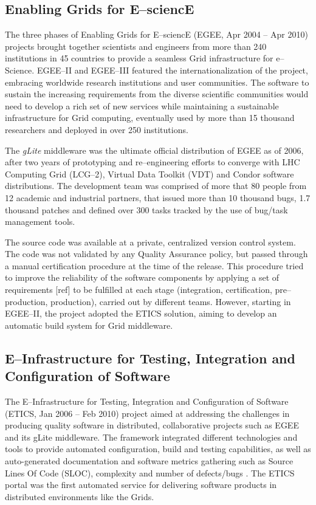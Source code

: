 \documentclass[journal]{IEEEtran}
\begin{document}
\subsection{Enabling Grids for E--sciencE}

The three phases of Enabling Grids for E--sciencE (EGEE, Apr 2004 -- Apr 2010)
\cite{cordis:egee, cordis:egee2, cordis:egee3} projects brought together
scientists and engineers from more than 240 institutions in 45 countries to
provide a seamless Grid infrastructure for e--Science. EGEE--II and EGEE--III
featured the internationalization of the project, embracing worldwide research
institutions and user communities. The software to sustain the increasing
requirements from the diverse scientific communities would need to develop a
rich set of new services while maintaining a sustainable infrastructure for
Grid computing, eventually used by more than 15 thousand researchers and deployed in
over 250 institutions.

The {\sl gLite} middleware \cite{glite} was the ultimate
official distribution of EGEE as of 2006, after two years of prototyping and
re--engineering efforts to converge with LHC Computing Grid (LCG--2), Virtual
Data Toolkit (VDT) and Condor \cite{condor} software distributions. The
development team was comprised of more that 80 people from 12 academic and
industrial partners, that issued more than 10 thousand bugs, 1.7 thousand patches and
defined over 300 tasks tracked by the use of bug/task management tools.

The
source code was available at a private, centralized version control system.
The code was not validated by any Quality Assurance policy, but passed through a manual
certification procedure at the time of the release. This procedure tried to
improve the reliability of the software components by applying a set of
requirements [ref] to be fulfilled at each stage (integration, certification,
pre--production, production), carried out by different teams. However, starting in
EGEE--II, the project adopted the ETICS solution, aiming to develop
an automatic build system for Grid middleware.

\subsection{E--Infrastructure for Testing, Integration and Configuration of Software}

The E--Infrastructure for Testing, Integration and Configuration of Software
\cite{cordis:etics, cordis:etics2} (ETICS, Jan 2006 -- Feb 2010) project aimed
at addressing the challenges in producing quality software in distributed,
collaborative projects such as EGEE and its gLite middleware. The framework
integrated different technologies and tools to provide automated configuration,
build and testing capabilities, as well as auto-generated documentation and
software metrics gathering such as Source Lines Of Code (SLOC), complexity and
number of defects/bugs \cite{etics}. The ETICS portal was the first automated
service for delivering software products in distributed environments like
the Grids.
\end{document}
